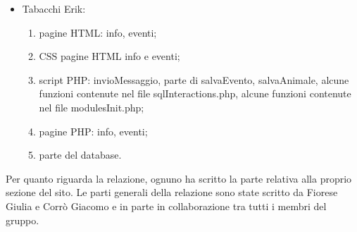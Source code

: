 \begin{itemize}
    \item Tabacchi Erik:
        \begin{enumerate}
            \item pagine HTML: info, eventi;
            \item CSS pagine HTML info e eventi;
            \item script PHP: invioMessaggio, parte di salvaEvento, salvaAnimale, alcune funzioni contenute nel file sqlInteractions.php, alcune funzioni contenute nel file modulesInit.php;
            \item pagine PHP: info, eventi;
            \item parte del database.
        \end{enumerate}
\end{itemize}
Per quanto riguarda la relazione, ognuno ha scritto la parte relativa alla proprio sezione del sito. Le parti generali della relazione sono state scritto da Fiorese Giulia e Corrò Giacomo e in parte in collaborazione tra tutti i membri del gruppo.
\pagebreak